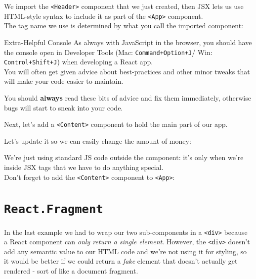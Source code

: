 
We import the \texttt{<Header>} component that we just created, then JSX lets us use HTML-style syntax to include it as part of the \texttt{<App>} component.
\\

The tag name we use is determined by what you call the imported component:



\begin{infobox}{Extra-Helpful Console}
    As always with JavaScript in the browser, you should have the console open in Developer Tools (Mac: \texttt{Command+Option+J}/ Win: \texttt{Control+Shift+J}) when developing a React app.
    \\

    You will often get given advice about best-practices and other minor tweaks that will make your code easier to maintain.


    You should \textbf{always} read these bits of advice and fix them immediately, otherwise bugs will start to sneak into your code.
\end{infobox}


Next, let's add a \texttt{<Content>} component to hold the main part of our app.


Let's update it so we can easily change the amount of money:


We're just using standard JS code outside the component: it's only when we're inside JSX tags that we have to do anything special.
\\

Don't forget to add the \texttt{<Content>} component to \texttt{<App>}:



\section{\texttt{React.Fragment}}

In the last example we had to wrap our two sub-components in a \texttt{<div>} because a React component can \textit{only return a single element}. However, the \texttt{<div>} doesn't add any semantic value to our HTML code and we're not using it for styling, so it would be better if we could return a \textit{fake} element that doesn't actually get rendered - sort of like a document fragment.
\\

